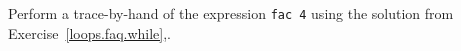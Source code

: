 Perform a trace-by-hand of the expression \lstinline{fac 4} using the solution from Exercise~\ref{loops.faq.while},.
